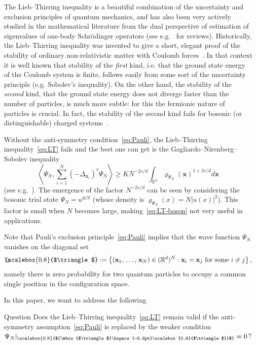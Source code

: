\documentclass[AHL, Unicode, longabstracts, published]{cedram}
\newcommand*\R {\mathbb{R}}
\newcommand\1{{\ensuremath {\mathds 1} }}
\newcommand{\bx}{\mathbf{x}}
\newcommand{\bDelta}{{\mbox{$\triangle$}\hspace{-8.6pt}\scalebox{0.8}{$\triangle$}}}
\newcommand{\scriptbDelta}{\scalebox{0.8}{$\bDelta$}}
\begin{document}
The Lieb--Thirring inequality is a beautiful combination of the uncertainty and exclusion principles of quantum mechanics, and has also been very actively studied in the mathematical literature from the dual perspective of estimation of eigenvalues of one-body Schr\"odinger operators (see e.g.~\cite{Laptev-12,LieSei-09} for reviews). Historically, the Lieb--Thirring inequality was invented to give a short, elegant proof of the stability of ordinary non-relativistic matter with Coulomb forces~\cite{LieThi-75}. In that context it is well known that stability of the \emph{first} kind, i.e. that the ground state energy of the Coulomb system is finite, follows easily from some sort of the uncertainty principle (e.g. Sobolev's inequality). On the other hand, the stability of the \emph{second} kind, that the ground state energy does not diverge faster than the number of particles, is much more subtle: for this the fermionic nature of particles is crucial. In fact, the stability of the second kind fails for bosonic (or distinguishable) charged systems~\cite{Dyson-67}.

Without the anti-symmetry condition~\eqref{eq:Pauli}, the Lieb--Thirring inequality~\eqref{eq:LT} fails and the best one can get is the Gagliardo--Nirenberg--Sobolev inequality
\begin{equation}\label{eq:LT-boson}
\left\langle \Psi_N, \sum_{i=1}^N (-\Delta_{\bx_i})^s \Psi_N\right\rangle \ge K N^{-2s/d} \int_{\R^d} \varrho_{\Psi_N}(\bx)^{1+2s/d} d\bx
\end{equation}
(see e.g.~\cite{LunNamPor-16}). The emergence of the factor $N^{-2s/d}$ can be seen by considering the bosonic trial state $\Psi_N=u^{\otimes N}$ (whose density is $\varrho_{\Psi_N}(x)=N|u(x)|^2$). This factor is small when $N$ becomes large, making~\eqref{eq:LT-boson} not very useful in applications.

Note that Pauli's exclusion principle~\eqref{eq:Pauli} implies that the wave function $\Psi_N$ vanishes on the diagonal set
\begin{equation}\label{eq:diagonal}
\bDelta := \left\{(\bx_1,\,\ldots,\,\bx_N) \in (\R^d)^{N}: \bx_i=\bx_j \text{ for some } i\neq j \right\},
\end{equation}
namely there is zero probability for two quantum particles to occupy a common single position in the configuration space.

In this paper, we want to address the following


\begin{enonce}[plain]{Question} Does the Lieb--Thirring inequality~\eqref{eq:LT} remain valid if the anti-symmetry assumption~\eqref{eq:Pauli} is replaced by the weaker condition $\Psi_N\rvert_{\scriptbDelta}=0\,?$
\end{enonce}
\end{document}

